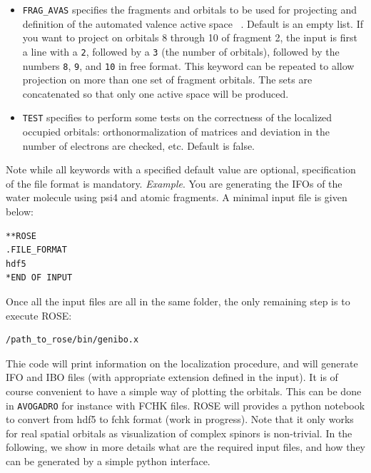\documentclass[preprint]{revtex4-1}
\begin{document}
\begin{itemize}
\begin{itemize}
\item \verb|FRAG_AVAS| specifies the fragments and orbitals to be used for projecting and definition of the automated valence active space ~\cite{sayfutyarova2017automated}. Default is an empty list.
If you want to project on orbitals 8 through 10 of fragment 2, the input is first a line with a \verb|2|, followed by a \verb|3| (the number of orbitals), followed by the numbers \verb|8|, \verb|9|, and \verb|10| in free format.
This keyword can be repeated to allow projection on more than one set of fragment orbitals. The sets are concatenated so that only one active space will be produced.
\item \verb|TEST| specifies to perform some tests on the correctness of the localized occupied orbitals: orthonormalization of matrices and deviation in the number of electrons are checked, etc. 
Default is false.
\end{itemize}
Note while all keywords with a specified default value are optional,  specification of the file format is mandatory.
{\it Example}. You are generating the IFOs of the water molecule using psi4 and atomic fragments. A minimal input file is given below:
\begin{lstlisting}[language=bash]
**ROSE
.FILE_FORMAT
hdf5
*END OF INPUT
\end{lstlisting}

Once all the input files are all in the same folder, the only remaining step is
to execute ROSE:
\begin{lstlisting}[language=bash]
/path_to_rose/bin/genibo.x
\end{lstlisting}

Thie code will print information on the localization procedure, and will generate
IFO and IBO files (with appropriate extension defined in the input).
It is of course convenient to have a simple way of plotting the orbitals. This can be done in \verb|AVOGADRO| 
for instance with FCHK files. ROSE will provides a python notebook to convert from hdf5 to fchk format (work in progress). 
Note that it only works for real spatial orbitals as visualization of complex spinors is non-trivial.
In the following, we show in more details what are the required input files, and how they can be generated by a simple python interface.


\end{itemize}
\end{document}
